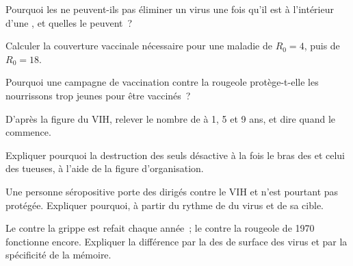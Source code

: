 \begin{exercise}[$\star\star$]\label{exo:g12:adaptive-immunity:8}
Pourquoi les  ne peuvent-ils pas éliminer un virus une fois
qu'il est à l'intérieur d'une , et quelles  le
peuvent~?
\end{exercise}

\begin{exercise}[$\star\star$]\label{exo:g12:adaptive-immunity:9}
Calculer la couverture vaccinale nécessaire pour une maladie de
$R_0 = 4$, puis de $R_0 = 18$.
\end{exercise}

\begin{exercise}[$\star\star$]\label{exo:g12:adaptive-immunity:10}
Pourquoi une campagne de vaccination contre la rougeole protège-t-elle
les nourrissons trop jeunes pour être vaccinés~?
\end{exercise}

\begin{exercise}[$\star\star$]\label{exo:g12:adaptive-immunity:11}
D'après la figure du VIH, relever le nombre de  à 1, 5 et 9 ans, et dire quand le  commence.
\end{exercise}

\begin{exercise}[$\star\star\star$]\label{exo:g12:adaptive-immunity:12}
Expliquer pourquoi la destruction des seuls 
désactive à la fois le bras des  et celui des 
tueuses, à l'aide de la figure d'organisation.
\end{exercise}

\begin{exercise}[$\star\star\star$]\label{exo:g12:adaptive-immunity:13}
Une personne séropositive porte des  dirigés contre le VIH et
n'est pourtant pas protégée. Expliquer pourquoi, à partir du rythme de
 du virus et de sa cible.
\end{exercise}

\begin{exercise}[$\star\star\star$]\label{exo:g12:adaptive-immunity:14}
Le  contre la grippe est refait chaque année~; le  contre
la rougeole de 1970 fonctionne encore. Expliquer la différence par la
 des  de surface des virus et par la spécificité de
la mémoire.
\end{exercise}

